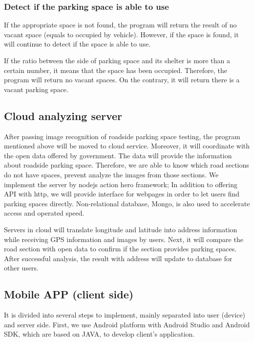 \documentclass[journal,article,submit,moreauthors,pdftex,10pt,a4paper]{mdpi}
\begin{document}
\subsubsection{Detect if the parking space is able to use}

If the appropriate space is not found, the program will return the
result of no vacant space (equals to occupied by vehicle). However, if
the space is found, it will continue to detect if the space is
able to use.

If the ratio between the side of parking space and its shelter is more
than a certain number, it means that the space has been occupied.
Therefore, the program will return no vacant spaces. On the contrary,
it will return there is a vacant parking space.

\subsection{Cloud analyzing server}

After passing image recognition of roadside parking space testing, the
program mentioned above will be moved to cloud service. Moreover, it will
coordinate with the open data offered by government. The data will
provide the information about roadside parking space. Therefore, we are
able to know which road sections do not have spaces, prevent analyze the
images from those sections. We implement the server by nodejs action
hero framework; In addition to offering API with http, we will provide
interface for webpages in order to let users find parking spaces
directly. Non-relational database, Mongo, is also used to accelerate
access and operated speed.

Servers in cloud will translate longitude and latitude into address
information while receiving GPS information and images by users. Next,
it will compare the road section with open data to confirm if the
section provides parking spaces. After successful analysis, the result
with address will update to database for other users.

\subsection{Mobile APP (client side)}

It is divided into several steps to implement, mainly separated into
user (device) and server side. First, we use Android platform with
Android Studio and Android SDK, which are based on JAVA, to develop
client's application.
\end{document}
